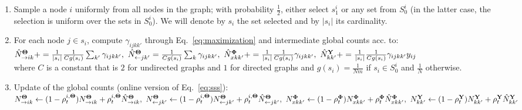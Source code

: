 \begin{enumerate}
\item Sample a node $i$ uniformly from all nodes in the graph; with probability $\frac{1}{2}$, either select $s_1^i$ or any set from $S_0^i$ (in the latter case, the selection is uniform over the sets in $S_0^i$). We will denote by $s_i$ the set selected and by $|s_i|$ its cardinality.
\item For each node $j \in s_i$, compute $\gamma_{ijkk'}$ through Eq.~\ref{eq:maximization} and intermediate global counts acc. to: {\small
$\hat N^{{\boldsymbol{\Theta}}}_{\rightarrow ik} += \frac{1}{|s_i|} \frac{1}{Cg(s_i)} \sum_{k'} \gamma_{ijkk'}, \,\, \hat N^{{\boldsymbol{\Theta}}}_{\leftarrow jk'} = \frac{1}{Cg(s_i)} \sum_{k} \gamma_{ijkk'}, \,\, \hat N^{{\boldsymbol{\Phi}}}_{xkk'} += \frac{1}{|s_i|} \frac{1}{Cg(s_i)} \gamma_{ijkk'}, \,\, \hat N^{{\mathbf{Y}}}_{kk'} += \frac{1}{|s_i|} \frac{1}{Cg(s_i)} \gamma_{ijkk'} y_{ij}$
}\\
where $C$ is a constant that is $2$ for undirected graphs and $1$ for directed graphs and $g(s_i) = \frac{1}{Nm}$ if $s_i \in S_0^i$ and $\frac{1}{N}$ otherwise.
\item Update of the global counts (online version of Eq.~\ref{eq:sss}): {\small $N^{{\boldsymbol{\Theta}}}_{\rightarrow ik} \leftarrow (1 - \rho^{i,{\boldsymbol{\Theta}}}_t) N^{{\boldsymbol{\Theta}}}_{\rightarrow ik} + \rho^{i,{\boldsymbol{\Theta}}}_t \hat N^{{\boldsymbol{\Theta}}}_{\rightarrow ik}, \,\, N^{{\boldsymbol{\Theta}}}_{\leftarrow jk'} \leftarrow (1 - \rho^{i,{\boldsymbol{\Theta}}}_t) N^{{\boldsymbol{\Theta}}}_{\leftarrow jk'} + \rho^{i,{\boldsymbol{\Theta}}}_t \hat N^{{\boldsymbol{\Theta}}}_{\leftarrow jk'}, \,\, N^{{\boldsymbol{\Phi}}}_{xkk'} \leftarrow (1 - \rho^{{\boldsymbol{\Phi}}}_t) N^{{\boldsymbol{\Phi}}}_{xkk'} + \rho^{{\boldsymbol{\Phi}}}_t \hat N^{{\boldsymbol{\Phi}}}_{xkk'}, \,\, N^{{\mathbf{Y}}}_{kk'} \leftarrow (1 - \rho^{{\mathbf{Y}}}_t) N^{{\mathbf{Y}}}_{kk'} + \rho^{{\mathbf{Y}}}_t \hat N^{{\mathbf{Y}}}_{kk'}$}

\end{enumerate}
